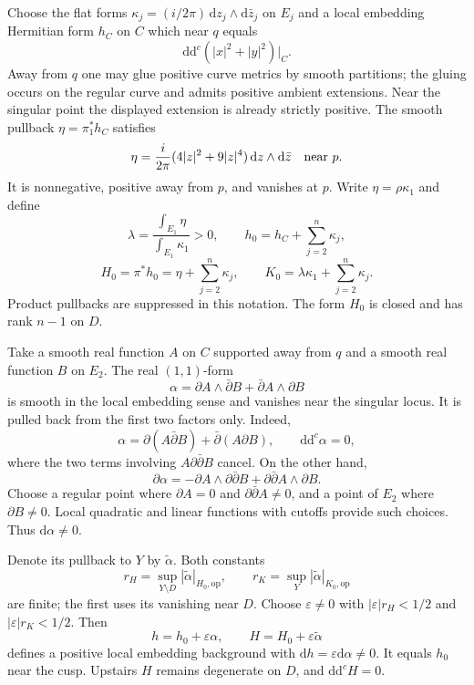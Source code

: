 \documentclass[11pt]{article}
\newcommand{\ddc}{\mathrm{d}\mathrm{d}^c}
\newcommand{\eps}{\varepsilon}
\begin{document}
Choose the flat forms $\kappa_j=(i/2\pi)\,\mathrm{d}z_j\wedge
\mathrm{d}\bar z_j$ on $E_j$ and a local embedding
Hermitian form $h_C$ on $C$ which near $q$ equals
\[
 \ddc(|x|^2+|y|^2)|_C.
\]
Away from $q$ one may glue positive curve metrics by smooth partitions;
the gluing occurs on the regular curve and admits positive ambient
extensions. Near the singular point the displayed extension is already
strictly positive. The smooth pullback $\eta=\pi_1^*h_C$ satisfies
\[
 \eta=\frac{i}{2\pi}(4|z|^2+9|z|^4)\,\mathrm{d}z\wedge
                  \mathrm{d}\bar z
 \quad\hbox{near }p.
\]
It is nonnegative, positive away from $p$, and vanishes at $p$.
Write $\eta=\rho\kappa_1$ and define
\[
 \lambda=\frac{\int_{E_1}\eta}{\int_{E_1}\kappa_1}>0,
 \qquad h_0=h_C+\sum_{j=2}^n\kappa_j,
\]
\[
 H_0=\pi^*h_0=\eta+\sum_{j=2}^n\kappa_j,
 \qquad K_0=\lambda\kappa_1+\sum_{j=2}^n\kappa_j.
\]
Product pullbacks are suppressed in this notation. The form $H_0$ is
closed and has rank $n-1$ on $D$.

Take a smooth real function $A$ on $C$ supported away from $q$ and a
smooth real function $B$ on $E_2$. The real $(1,1)$-form
\begin{equation}\label{eq:alpha}
 \alpha=\partial A\wedge\bar\partial B+
                  \bar\partial A\wedge\partial B
\end{equation}
is smooth in the local embedding sense and vanishes near the singular locus.
It is pulled back from the first two factors only.
Indeed,
\[
 \alpha=\partial(A\bar\partial B)+\bar\partial(A\partial B),
 \qquad \ddc\alpha=0,
\]
where the two terms involving $A\partial\bar\partial B$ cancel.
On the other hand,
\[
 \partial\alpha=-\partial A\wedge\partial\bar\partial B
                      +\partial\bar\partial A\wedge\partial B.
\]
Choose a regular point where $\partial A=0$ and
$\partial\bar\partial A\ne0$, and a point of $E_2$ where
$\partial B\ne0$. Local quadratic and linear functions with cutoffs
provide such choices. Thus $\mathrm{d}\alpha\ne0$.

Denote its pullback to $Y$ by $\widetilde\alpha$. Both constants
\[
 r_H=\sup_{Y\setminus D}|\widetilde\alpha|_{H_0,\mathrm{op}},
 \qquad r_K=\sup_Y|\widetilde\alpha|_{K_0,\mathrm{op}}
\]
are finite; the first uses its vanishing near $D$.
Choose $\eps\ne0$ with $|\eps|r_H<1/2$ and $|\eps|r_K<1/2$.
Then
\[
 h=h_0+\eps\alpha,\qquad H=H_0+\eps\widetilde\alpha
\]
defines a positive local embedding background with
$\mathrm{d}h=\eps\mathrm{d}\alpha\ne0$. It equals $h_0$ near the cusp.
Upstairs $H$ remains degenerate on $D$, and $\ddc H=0$.
\end{document}
